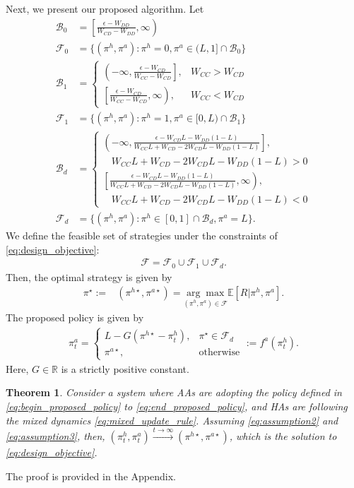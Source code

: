 \documentclass[letterpaper]{article} %
\newtheorem{theorem}{Theorem}
\begin{document}
Next, we present our proposed algorithm. Let
\begin{align}
    \mathcal{B}_0&=\left[\frac{\epsilon-W_{DD}}{W_{CD}-W_{DD}},\infty\right)\label{eq:begin_proposed_policy}\\
    \mathcal{F}_0&=\{(\pi^h,\pi^a):\pi^h=0,\pi^a\in(L,1]\cap\mathcal{B}_0\}\\
    \mathcal{B}_1&=\begin{cases}
        \left(-\infty,\frac{\epsilon-W_{CD}}{W_{CC}-W_{CD}}\right], & W_{CC}>W_{CD} \\ 
        \left[\frac{\epsilon-W_{CD}}{W_{CC}-W_{CD}},\infty\right), & W_{CC}<W_{CD}
    \end{cases}\\
    \mathcal{F}_1&=\{(\pi^h,\pi^a):\pi^h=1,\pi^a\in[0,L)\cap\mathcal{B}_1\}\\
    \mathcal{B}_d&=\begin{cases}
        \left(-\infty,\frac{\epsilon-W_{CD}L-W_{DD}(1-L)}{W_{CC}L+W_{CD}-2W_{CD}L-W_{DD}(1-L)}\right], \\ 
        \ \ \ \ W_{CC}L+W_{CD}-2W_{CD}L-W_{DD}(1-L)>0 \\ 
        \left[\frac{\epsilon-W_{CD}L-W_{DD}(1-L)}{W_{CC}L+W_{CD}-2W_{CD}L-W_{DD}(1-L)},\infty\right), \\
        \ \ \ \ W_{CC}L+W_{CD}-2W_{CD}L-W_{DD}(1-L)<0
    \end{cases}\\
    \mathcal{F}_d&=\{(\pi^h,\pi^a):\pi^h\in[0,1]\cap\mathcal{B}_d,\pi^a=L\}.
\end{align}
We define the feasible set of strategies under the constraints of \eqref{eq:design_objective}:
\begin{align}
\label{eq:end_feasible}
    \mathcal{F}= \mathcal{F}_0\cup \mathcal{F}_1\cup \mathcal{F}_d.
\end{align}
Then, the optimal strategy is given by
\begin{align}
    \pi^\star:=&(\pi^{h \star},\pi^{a \star})=\underset{(\pi^h,\pi^a)\in\mathcal{F}}{\arg\max}\mathbb{E}[R|\pi^h,\pi^a].\label{eq:pi_pound}
\end{align}
The proposed policy is given by
\begin{align}
\label{eq:end_proposed_policy}
    \pi^a_t=\begin{cases}
        L-G(\pi^{h \star}-\pi^h_t), & \pi^{\star}\in\mathcal{F}_d\\
        \pi^{a \star}, & \textrm{otherwise}
    \end{cases}:=f^a(\pi^h_t).
\end{align}
Here, $G \in \mathbb R$ is a strictly positive constant.
\begin{theorem} \label{thm:proposed_method_combined}
Consider a system where AAs are adopting the policy defined in \eqref{eq:begin_proposed_policy} to \eqref{eq:end_proposed_policy}, and HAs are following the mixed dynamics \eqref{eq:mixed_update_rule}. Assuming \eqref{eq:assumption2} and \eqref{eq:assumption3}, then, $(\pi^h_t,\pi^a_t) \xrightarrow[]{t\rightarrow\infty} (\pi^{h \star},\pi^{a \star})$, which is the solution to \eqref{eq:design_objective}.
\end{theorem}
The proof is provided in the Appendix.
\end{document}

